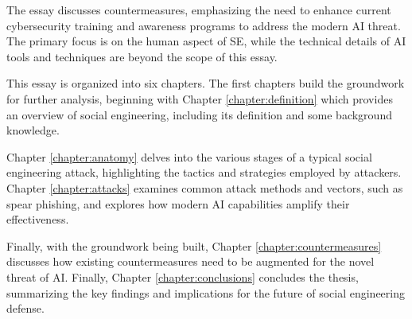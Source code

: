 The essay discusses countermeasures, emphasizing the need to enhance current cybersecurity training and awareness programs to address the modern AI threat. The primary focus is on the human aspect of SE, while the technical details of AI tools and techniques are beyond the scope of this essay.



This essay is organized into six chapters. The first chapters build the groundwork for further analysis, beginning with Chapter \ref{chapter:definition} which provides an overview of social engineering, including its definition and some background knowledge.


Chapter \ref{chapter:anatomy} delves into the various stages of a typical social engineering attack, highlighting the tactics and strategies employed by attackers. Chapter \ref{chapter:attacks} examines common attack methods and vectors, such as spear phishing, and explores how modern AI capabilities amplify their effectiveness.

Finally, with the groundwork being built, Chapter \ref{chapter:countermeasures} discusses how existing countermeasures need to be augmented for the novel threat of AI. Finally, Chapter \ref{chapter:conclusions} concludes the thesis, summarizing the key findings and implications for the future of social engineering defense.




